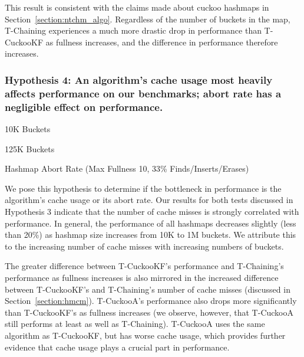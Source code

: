 This result is consistent with the claims made about cuckoo hashmaps in Section~\ref{section:ntchm_algo}. Regardless of the number of buckets in the map, T-Chaining experiences a much more drastic drop in performance than T-CuckooKF as fullness increases, and the difference in performance therefore increases.

\vspace{12pt}
\noindent{}

\subsubsection{Hypothesis 4: An algorithm's cache usage most heavily affects performance on our benchmarks; abort rate has a negligible effect on performance.}

    \begin{table}[t]
    \centering
	\singlespace
        \begin{minipage}{0.5\textwidth}
        \centering
        
        \caption*{10K Buckets}
            \vspace{12pt}
        \end{minipage}
        \begin{minipage}{0.5\textwidth}
        \centering
        
        \caption*{125K Buckets}
        \end{minipage}
        \caption{Hashmap Abort Rate (Max Fullness 10, 33\% Finds/Inserts/Erases)}
		\label{tab:hm_aborts}
    \end{table}

    We pose this hypothesis to determine if the bottleneck in performance is the algorithm's cache usage or its abort rate. 
Our results for both tests discussed in Hypothesis 3 indicate that the number of cache misses is strongly correlated with performance. In general, the performance of all hashmaps decreases slightly (less than 20\%) as hashmap size increases from 10K to 1M buckets. We attribute this to the increasing number of cache misses with increasing numbers of buckets.

The greater difference between T-CuckooKF's performance and T-Chaining's performance as fullness increases is also mirrored in the increased difference between T-CuckooKF's and T-Chaining's number of cache misses (discussed in Section~\ref{section:hmcm}). T-CuckooA's performance also drops more significantly than T-CuckooKF's as fullness increases (we observe, however, that T-CuckooA still performs at least as well as T-Chaining). T-CuckooA uses the same algorithm as T-CuckooKF, but has worse cache usage, which provides further evidence that cache usage plays a crucial part in performance. 

